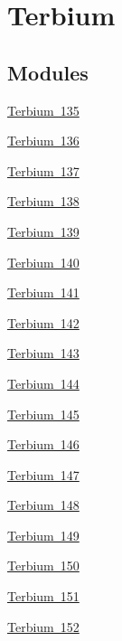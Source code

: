\hypertarget{group___isotope_const-_terbium}{}\section{Terbium}
\label{group___isotope_const-_terbium}
\subsection*{Modules}
\begin{DoxyCompactItemize}
\item 
\mbox{\hyperlink{group___isotope_const-_terbium-_tb135}{Terbium 135}}
\item 
\mbox{\hyperlink{group___isotope_const-_terbium-_tb136}{Terbium 136}}
\item 
\mbox{\hyperlink{group___isotope_const-_terbium-_tb137}{Terbium 137}}
\item 
\mbox{\hyperlink{group___isotope_const-_terbium-_tb138}{Terbium 138}}
\item 
\mbox{\hyperlink{group___isotope_const-_terbium-_tb139}{Terbium 139}}
\item 
\mbox{\hyperlink{group___isotope_const-_terbium-_tb140}{Terbium 140}}
\item 
\mbox{\hyperlink{group___isotope_const-_terbium-_tb141}{Terbium 141}}
\item 
\mbox{\hyperlink{group___isotope_const-_terbium-_tb142}{Terbium 142}}
\item 
\mbox{\hyperlink{group___isotope_const-_terbium-_tb143}{Terbium 143}}
\item 
\mbox{\hyperlink{group___isotope_const-_terbium-_tb144}{Terbium 144}}
\item 
\mbox{\hyperlink{group___isotope_const-_terbium-_tb145}{Terbium 145}}
\item 
\mbox{\hyperlink{group___isotope_const-_terbium-_tb146}{Terbium 146}}
\item 
\mbox{\hyperlink{group___isotope_const-_terbium-_tb147}{Terbium 147}}
\item 
\mbox{\hyperlink{group___isotope_const-_terbium-_tb148}{Terbium 148}}
\item 
\mbox{\hyperlink{group___isotope_const-_terbium-_tb149}{Terbium 149}}
\item 
\mbox{\hyperlink{group___isotope_const-_terbium-_tb150}{Terbium 150}}
\item 
\mbox{\hyperlink{group___isotope_const-_terbium-_tb151}{Terbium 151}}
\item 
\mbox{\hyperlink{group___isotope_const-_terbium-_tb152}{Terbium 152}}

\end{DoxyCompactItemize}
